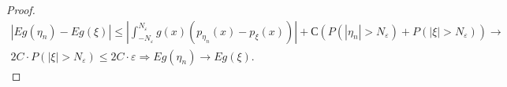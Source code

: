 \begin{proof}
\begin{gather*}
    | Eg( \eta _{n}) -Eg( \xi )| \leqslant \left| \int _{-N_{\varepsilon }}^{N_{\varepsilon }} g( x)( p_{\eta _{n}}( x) -p_{\xi }( x))\right| +С( P(| \eta _{n}|  >N_{\varepsilon }) +P( |\xi | >N_{\varepsilon }))\rightarrow\\ 2C\cdotp P(| \xi |  >N_{\varepsilon }) \leqslant 2C\cdotp \varepsilon \Rightarrow Eg( \eta _{n})\rightarrow Eg( \xi ) .
\end{gather*}
\end{proof}
